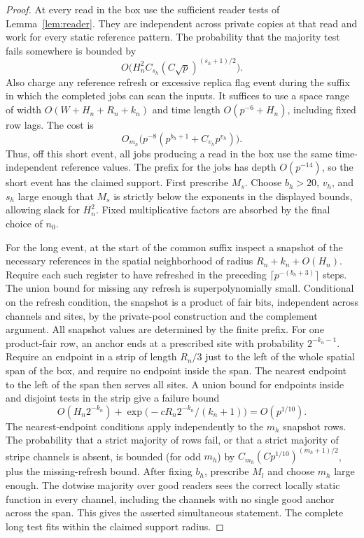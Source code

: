 \begin{proof}
At every read in the box use the sufficient reader tests of Lemma~\ref{lem:reader}. They are independent across private copies at that read and work for every static reference pattern. The probability that the majority test fails somewhere is bounded by
\[
O\bigl(H_n^2 C_{s_h}(C\sqrt p)^{(s_h+1)/2}\bigr).
\]
Also charge any reference refresh or excessive replica flag event during the suffix in which the completed jobs can scan the inputs. It suffices to use a space range of width \(O(W+H_n+R_n+k_n)\) and time length \(O(p^{-6}+H_n)\), including fixed row lags. The cost is
\[
O_{m_h}\bigl(p^{-8}(p^{b_h+1}+C_{v_h}p^{v_h})\bigr).
\]
Thus, off this short event, all jobs producing a read in the box use the same time-independent reference values. The prefix for the jobs has depth \(O(p^{-14})\), so the short event has the claimed support. First prescribe \(M_s\). Choose \(b_h>20\), \(v_h\), and \(s_h\) large enough that \(M_s\) is strictly below the exponents in the displayed bounds, allowing slack for \(H_n^2\). Fixed multiplicative factors are absorbed by the final choice of \(n_0\).

For the long event, at the start of the common suffix inspect a snapshot of the necessary references in the spatial neighborhood of radius \(R_n+k_n+O(H_n)\). Require each such register to have refreshed in the preceding \(\lceil p^{-(b_h+3)}\rceil\) steps. The union bound for missing any refresh is superpolynomially small. Conditional on the refresh condition, the snapshot is a product of fair bits, independent across channels and sites, by the private-pool construction and the complement argument. All snapshot values are determined by the finite prefix. For one product-fair row, an anchor ends at a prescribed site with probability \(2^{-k_n-1}\). Require an endpoint in a strip of length \(R_n/3\) just to the left of the whole spatial span of the box, and require no endpoint inside the span. The nearest endpoint to the left of the span then serves all sites. A union bound for endpoints inside and disjoint tests in the strip give a failure bound
\[
O(H_n2^{-k_n})+\exp\bigl(-cR_n2^{-k_n}/(k_n+1)\bigr)=O(p^{1/10}).
\]
The nearest-endpoint conditions apply independently to the \(m_h\) snapshot rows. The probability that a strict majority of rows fail, or that a strict majority of stripe channels is absent, is bounded (for odd \(m_h\)) by \(C_{m_h}(C p^{1/10})^{(m_h+1)/2}\), plus the missing-refresh bound. After fixing \(b_h\), prescribe \(M_l\) and choose \(m_h\) large enough. The dotwise majority over good readers sees the correct locally static function in every channel, including the channels with no single good anchor across the span. This gives the asserted simultaneous statement. The complete long test fits within the claimed support radius.


\end{proof}
